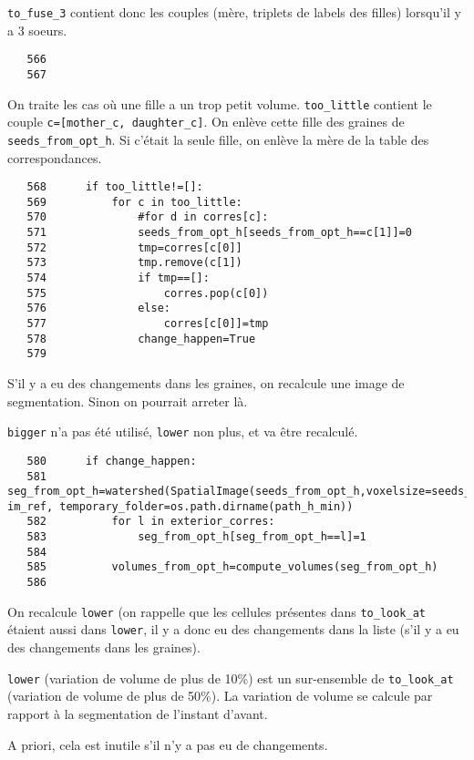 \documentclass{article}
\def \mycolor {red}
\begin{document}
\color{\mycolor}
\verb|to_fuse_3| contient donc les couples (m\`ere, triplets de labels des filles) lorsqu'il y a 3 soeurs.
\color{black}
\begin{verbatim}
   566	
   567	
\end{verbatim} 
\color{\mycolor}
On traite les cas o\`u une fille a un trop petit volume. 
\verb|too_little| contient le couple \verb|c=[mother_c, daughter_c]|.
On enl\`eve cette fille des graines de \verb|seeds_from_opt_h|. Si c'\'etait la seule fille, on enl\`eve la m\`ere de la table des correspondances.
\color{black}
\begin{verbatim}
   568	    if too_little!=[]:
   569	        for c in too_little:
   570	            #for d in corres[c]:
   571	            seeds_from_opt_h[seeds_from_opt_h==c[1]]=0
   572	            tmp=corres[c[0]]
   573	            tmp.remove(c[1])
   574	            if tmp==[]:
   575	                corres.pop(c[0])
   576	            else:
   577	                corres[c[0]]=tmp
   578	            change_happen=True
   579	
\end{verbatim} 
\color{\mycolor}
S'il y a eu des changements dans les graines, on recalcule une image de segmentation. Sinon on pourrait arreter l\`a.

\verb|bigger| n'a pas \'et\'e utilis\'e, \verb|lower| non plus, et va \^etre recalcul\'e.
\color{black}
\begin{verbatim}
   580	    if change_happen:
   581	        seg_from_opt_h=watershed(SpatialImage(seeds_from_opt_h,voxelsize=seeds_from_opt_h.voxelsize), im_ref, temporary_folder=os.path.dirname(path_h_min))
   582	        for l in exterior_corres:
   583	            seg_from_opt_h[seg_from_opt_h==l]=1  
   584	            
   585	        volumes_from_opt_h=compute_volumes(seg_from_opt_h)
   586	
\end{verbatim} 
\color{\mycolor}
On recalcule \verb|lower| (on rappelle que les cellules pr\'esentes dans \verb|to_look_at| \'etaient aussi dans \verb|lower|, il y a donc eu des changements dans la liste (s'il y a eu des changements dans les graines).

\verb|lower| (variation de volume de plus de 10\%) est un sur-ensemble de \verb|to_look_at| (variation de volume de plus de 50\%). La variation de volume se calcule par rapport \`a la segmentation de l'instant d'avant.

A priori, cela est inutile s'il n'y a pas eu de changements.
\end{document}
